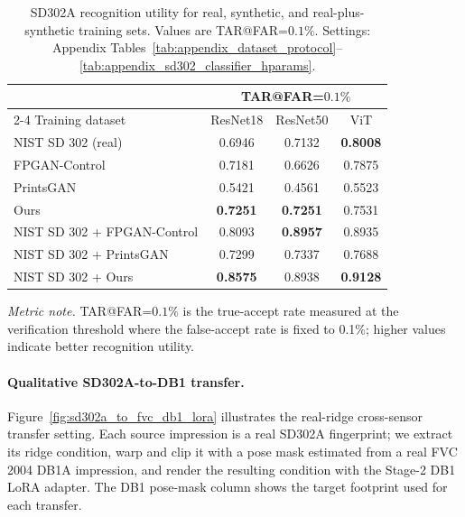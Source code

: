 \documentclass{article}
\begin{document}
\begin{table}[!htbp]
    \centering
    \footnotesize
    \caption{SD302A recognition utility for real, synthetic, and
    real-plus-synthetic training sets.  Values are TAR@FAR=$0.1\%$.  Settings:
    Appendix Tables~\ref{tab:appendix_dataset_protocol}--\ref{tab:appendix_sd302_classifier_hparams}.}
    \label{tab:sd302_tar01_backbones}
    \setlength{\tabcolsep}{6pt}
    \renewcommand{\arraystretch}{0.92}
    \begin{tabular}{lccc}
        \toprule
        & \multicolumn{3}{c}{TAR@FAR=$0.1\%$} \\
        \cmidrule(lr){2-4}
        Training dataset & ResNet18 & ResNet50 & ViT \\
        \midrule
        NIST SD 302 (real) & 0.6946 & 0.7132 & \textbf{0.8008} \\
        FPGAN-Control & 0.7181 & 0.6626 & 0.7875 \\
        PrintsGAN & 0.5421 & 0.4561 & 0.5523 \\
        Ours & \textbf{0.7251} & \textbf{0.7251} & 0.7531 \\
        \midrule
        NIST SD 302 + FPGAN-Control & 0.8093 & \textbf{0.8957} & 0.8935 \\
        NIST SD 302 + PrintsGAN & 0.7299 & 0.7337 & 0.7688 \\
        NIST SD 302 + Ours & \textbf{0.8575} & 0.8938 & \textbf{0.9128} \\
        \bottomrule
    \end{tabular}
    \vspace{0.35em}
    \parbox{0.94\linewidth}{\scriptsize\textit{Metric note.}
    TAR@FAR=$0.1\%$ is the true-accept rate measured at the verification
    threshold where the false-accept rate is fixed to 0.1\%; higher values
    indicate better recognition utility.}
\end{table}

\paragraph{Qualitative SD302A-to-DB1 transfer.}

Figure~\ref{fig:sd302a_to_fvc_db1_lora} illustrates the real-ridge
cross-sensor transfer setting.  Each source impression is a real SD302A
fingerprint; we extract its ridge condition, warp and clip it with a pose mask
estimated from a real FVC 2004 DB1A impression, and render the resulting
condition with the Stage-2 DB1 LoRA adapter.  The DB1 pose-mask column shows the
target footprint used for each transfer.
\end{document}
